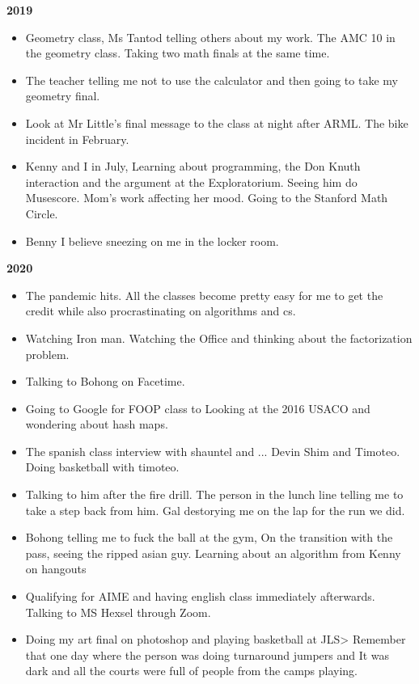 \documentclass[12pt]{article}
\begin{document}
 \textbf{2019}
\begin{itemize}
\item Geometry class, Ms Tantod telling others about my work. The AMC 10 in the geometry class. Taking two math finals at the same time. \item The teacher telling me not to use the calculator and then going to take my geometry final. \item Look at Mr Little's final message to the class at night after ARML. The bike incident in February.
\item Kenny and I in July, Learning about programming, the Don Knuth interaction and the argument at the Exploratorium. Seeing him do Musescore. Mom's work affecting her mood. Going to the Stanford Math Circle.\item  Benny I believe sneezing on me in the locker room.
\end{itemize}
\textbf{2020}
\begin{itemize}
\item The pandemic hits. All the classes become pretty easy for me to get the credit while also procrastinating on algorithms and cs. \item Watching Iron man. Watching the Office and thinking about the factorization problem. \item Talking to Bohong on Facetime.\item  Going to Google for FOOP class to Looking at the 2016 USACO and wondering about hash maps.\item  The spanish class interview with shauntel and ... Devin Shim and Timoteo. Doing basketball with timoteo. \item Talking to him after the fire drill. The person in the lunch line telling me to take a step back from him. Gal destorying me on the lap for the run we did. \item Bohong telling me to fuck the ball at the gym, On the transition with the pass, seeing the ripped asian guy. Learning about an algorithm from Kenny on hangouts


\item Qualifying for AIME and having english class immediately afterwards. Talking to MS Hexsel through Zoom. \item Doing my art final on photoshop and playing basketball at JLS> Remember that one day where the person was doing turnaround jumpers and It was dark and all the courts were full of people from the camps playing. \end{itemize}
\end{document}

